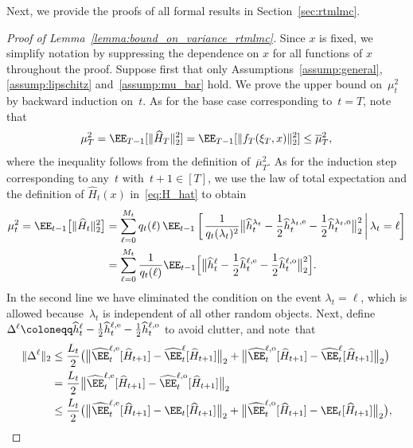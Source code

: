 \documentclass[11pt]{article}
\let\hat\widehat
\begin{document}
Next, we provide the proofs of all formal results in Section~\ref{sec:rtmlmc}.

\begin{proof}[Proof of Lemma~\ref{lemma:bound_on_variance_rtmlmc}]
Since $x$ is fixed, we simplify notation by suppressing the dependence on $x$ for all functions of $x$ throughout the proof. Suppose first that only Assumptions~\ref{assump:general}, \ref{assump:lipschitz} and~\ref{assump:mu_bar} hold. We prove the upper bound on~$\mu_t^2$ by backward induction on~$t$. As for the base case corresponding to~$t=T$, note that 
\[
    \mu_T^2=\EE_{T-1}[\|\hat{H}_T\|_2^2]= \EE_{T-1}[\|f_T(\xi_T,x)\|_2^2]\leq \overline \mu_T^2,
\]
where the inequality follows from the definition of~$\overline \mu_T^2$. As for the induction step corresponding to any~$t$ with~$t+1\in[T]$, we use the law of total expectation and the definition of $\hat H_t(x)$ in~\eqref{eq:H_hat} to obtain
\begin{equation}
    \label{eq:moment_of_H_telescoping}
    \begin{aligned}
    \mu_t^2 = \EE_{t-1}\big[\|\hat{H}_t\|^2_2 \big] & =\sum_{\ell=0}^{M_{t}} q_t(\ell)\,\EE_{t-1}\left[ \left. \frac{1}{q_t(\lambda_t)^2} \big\| \hat{h}_{t}^{\lambda_t}-\frac{1}{2}\hat{h}_t^{\lambda_t, {\rm e}}-\frac{1}{2}\hat{h}_t^{\lambda_t, {\rm o}}\big\|^2_2 \,\right| \lambda_t=\ell\right] \\
    & =\sum_{\ell=0}^{M_{t}} \frac{1}{q_t(\ell)} \EE_{t-1}\Big[\big\|\hat{h}_{t}^{\ell}-\frac{1}{2}\hat{h}_t^{\ell, {\rm e}}-\frac{1}{2}\hat{h}_t^{\ell, {\rm o}}\big\|^2_2\Big].
\end{aligned}
\end{equation}
In the second line we have eliminated the condition on the event $\lambda_t=\ell$, which is allowed because~$\lambda_t$ is independent of all other random objects. Next, define $\Delta^\ell\coloneqq\hat{h}_{t}^{\ell}-\frac{1}{2}\hat{h}_t^{\ell, {\rm e}}-\frac{1}{2}\hat{h}_t^{\ell, {\rm o}}$ to avoid clutter, and note~that
\begin{align*}
    \|\Delta^\ell\|_2 & \leq \frac{L_t}{2}\big( \big\|\hat\EE_t^{\ell,{\rm e}}[\hat{H}_{t+1}] - \hat\EE_t^{\ell}[\hat{H}_{t+1}]\big\|_2 +\big\|\hat \EE_t^{\ell,{\rm o}}[\hat{H}_{t+1}] -\hat\EE_{t}^{\ell}[\hat{H}_{t+1}] \big\|_2 \big)\\
    & = \frac{L_t}{2} \big\|\hat \EE_t^{\ell,{\rm e}}[\hat{H}_{t+1}] -\hat\EE_{t}^{\ell,{\rm o}}[\hat{H}_{t+1}]\big\|_2 \\
    & \leq \frac{L_t}{2} \big(\big\|\hat \EE_t^{\ell,{\rm e}}[\hat{H}_{t+1}] -\EE_{t}[\hat{H}_{t+1}] \big\|_2 + \big\|\hat \EE_t^{\ell,{\rm o}}[\hat{H}_{t+1}] - \EE_{t}[\hat{H}_{t+1}] \big\|_2\big),

\end{align*}
\end{proof}
\end{document}
